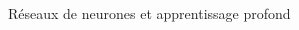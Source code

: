 \documentclass[french]{beamer}
\begin{document}
\begin{frame}{Réseaux de neurones et apprentissage profond}
\begin{columns}[T]
\begin{column}{.52\textwidth}
\end{column}
\end{columns}
\end{frame}
\end{document}
